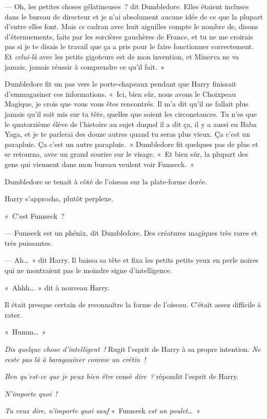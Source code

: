 --- Oh, les petites choses gélatineuses~? dit Dumbledore. Elles étaient incluses dans le bureau de directeur et je n'ai absolument aucune idée de ce que la plupart d'entre elles font. Mais \emph{ce} cadran avec huit aiguilles compte le nombre de, disons d'éternuements, faits par les sorcières gauchères de France, et tu ne me croirais pas si je te disais le travail que ça a pris pour le faire fonctionner correctement. Et \emph{celui-là} avec les petits gigoteurs est de mon invention, et Minerva ne va jamais, jamais réussir à comprendre ce qu'il fait.~»

Dumbledore fit un pas vers le porte-chapeaux pendant que Harry finissait d'emmagasiner ces informations. «~Ici, bien sûr, nous avons le Choixpeau Magique, je crois que vous vous êtes rencontrés. Il m'a dit qu'il ne fallait plus jamais qu'il soit mis sur ta tête, quelles que soient les circonstances. Tu n'es que le quatorzième élève de l'histoire au sujet duquel il a dit ça, il y a aussi eu Baba Yaga, et je te parlerai des douze autres quand tu seras plus vieux. Ça c'est un parapluie. Ça c'est un autre parapluie.~» Dumbledore fit quelques pas de plus et se retourna, avec un grand sourire sur le visage. «~Et bien sûr, la plupart des gens qui viennent dans mon bureau veulent voir Fumseck.~»

Dumbledore se tenait à côté de l'oiseau sur la plate-forme dorée.

Harry s'approcha, plutôt perplexe.

«~C'est Fumseck~?

--- Fumseck est un phénix, dit Dumbledore. Des créatures magiques très rares et très puissantes.

--- Ah…~» dit Harry. Il baissa sa tête et fixa les petits petits yeux en perle noires qui ne montraient pas le moindre signe d'intelligence.

«~Ahhh…~» dit à nouveau Harry.

Il était presque certain de reconnaître la forme de l'oiseau. C'était assez difficile à rater.

«~Humm…~»

\emph{Dis quelque chose d'intelligent~!} Rugit l'esprit de Harry à sa propre intention. \emph{Ne reste pas là à baragouiner comme un crétin~!}

\emph{Ben qu'est-ce que je peux bien être} censé \emph{dire~?} répondit l'esprit de Harry.

\emph{N'importe quoi~!}

\emph{Tu veux dire, n'importe quoi sauf} «~Fumseck \emph{est un poulet…}~»

